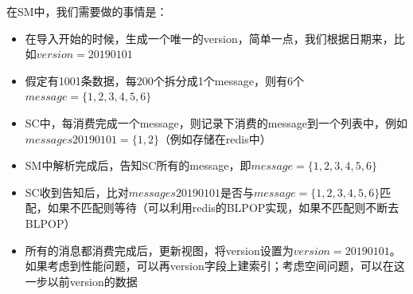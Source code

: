 \documentclass[12pt]{article}
\begin{document}
\begin{Shaded}
\begin{Highlighting}[]
 
     
\NormalTok{(}\NormalTok{) } \NormalTok{,}
\NormalTok{(}\NormalTok{) } \NormalTok{,}
 \NormalTok{(}\NormalTok{)}
\NormalTok{);}

 
  
\end{Highlighting}
\end{Shaded}

在SM中，我们需要做的事情是：

\begin{itemize}
\tightlist
\item
  在导入开始的时候，生成一个唯一的version，简单一点，我们根据日期来，比如\({\displaystyle version=20190101}\)
\item
  假定有1001条数据，每200个拆分成1个message，则有6个\({\displaystyle message=\{1, 2, 3, 4, 5, 6\}}\)
\item
  SC中，每消费完成一个message，则记录下消费的message到一个列表中，例如\({\displaystyle  messages20190101 = \{1, 2\}}\)（例如存储在redis中）
\item
  SM中解析完成后，告知SC所有的message，即\({\displaystyle message=\{1, 2, 3, 4, 5, 6\}}\)
\item
  SC收到告知后，比对\({\displaystyle  messages20190101}\)是否与\({\displaystyle message=\{1, 2, 3, 4, 5, 6\}}\)匹配，如果不匹配则等待（可以利用redis的BLPOP实现，如果不匹配则不断去BLPOP）
\item
  所有的消息都消费完成后，更新视图，将version设置为\({\displaystyle version=20190101}\)。如果考虑到性能问题，可以再version字段上建索引；考虑空间问题，可以在这一步以前version的数据
\end{itemize}
\end{document}
